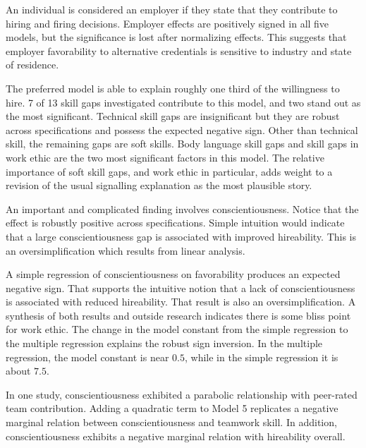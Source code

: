 \documentclass[review]{elsarticle}
\begin{document}
An individual is considered an employer if they state that they contribute to hiring and firing decisions.
Employer effects are positively signed in all five models, but the significance is lost after normalizing effects.
This suggests that employer favorability to alternative credentials is sensitive to industry and state of residence.

The preferred model is able to explain roughly one third of the willingness to hire.
7 of 13 skill gaps investigated contribute to this model, and two stand out as the most significant.
Technical skill gaps are insignificant but they are robust across specifications and possess the expected negative sign.
Other than technical skill, the remaining gaps are soft skills.
Body language skill gaps and skill gaps in work ethic are the two most significant factors in this model.
The relative importance of soft skill gaps, and work ethic in particular, adds weight to a revision of the usual signalling explanation as the most plausible story.

An important and complicated finding involves conscientiousness.
Notice that the effect is robustly positive across specifications.
Simple intuition would indicate that a large conscientiousness gap is associated with improved hireability.
This is an oversimplification which results from linear analysis.

A simple regression of conscientiousness on favorability produces an expected negative sign.
That supports the intuitive notion that a lack of conscientiousness is associated with reduced hireability.
That result is also an oversimplification.
A synthesis of both results and outside research indicates there is some bliss point for work ethic.
The change in the model constant from the simple regression to the multiple regression explains the robust sign inversion.
In the multiple regression, the model constant is near $0.5$, while in the simple regression it is about $7.5$.

In one study, conscientiousness exhibited a parabolic relationship with peer-rated team contribution\cite{curcseu2019personality}.
Adding a quadratic term to Model 5 replicates a negative marginal relation between conscientiousness and teamwork skill.
In addition, conscientiousness exhibits a negative marginal relation with hireability overall.
\end{document}
